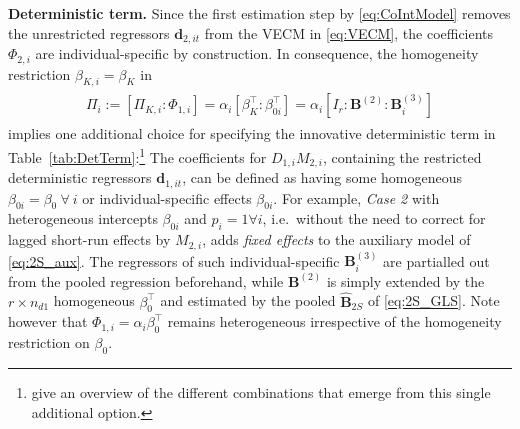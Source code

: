 \textbf{Deterministic term.} Since the first estimation step by \eqref{eq:CoIntModel} removes the unrestricted regressors $ \boldsymbol{d}_{2,it} $ from the VECM in \eqref{eq:VECM}, the coefficients $ \Phi_{2,i} $ are individual-specific by construction. In consequence, the homogeneity restriction $ \beta_{K,i} = \beta_K $ in 
\begin{align} \label{eq:2S_det}
\begin{split}
	\Pi_i := \left[ \Pi_{K,i} : \Phi_{1,i} \right] = \alpha_i \left[ \beta_{K}^\top : \beta_{0i}^\top \right] = \alpha_i \left[I_r^{\ } : \mathbf{B}_{\ }^{(2)} : \mathbf{B}_i^{(3)} \right]
\end{split}
\end{align}
implies one additional choice for specifying the innovative deterministic term in Table~\ref{tab:DetTerm}:\footnote{\citet[Ch.~4.1]{GroenFrank2003} give an overview of the different combinations that emerge from this single additional option.} 
The coefficients for $ D_{1,i} M_{2,i} $, containing the restricted deterministic regressors $ \boldsymbol{d}_{1,it} $, can be defined as having some homogeneous $ \beta_{0i} = \beta_{0} \ \forall \ i $ or individual-specific effects $ \beta_{0i} $. For example, \textit{Case 2} with heterogeneous intercepts $ \beta_{0i} $ and $ p_i = 1 \forall i $, i.e.~without the need to correct for lagged short-run effects by $ M_{2,i} $, adds \textit{fixed effects} to the auxiliary model of \eqref{eq:2S_aux}. The regressors of such individual-specific $ \mathbf{B}_i^{(3)} $ are partialled out from the pooled regression beforehand, while $ \mathbf{B}^{(2)} $ is simply extended by the $ r \times n_{d1} $ homogeneous $ \beta_{0}^\top $ and estimated by the pooled $ \widehat{\mathbf{B}}_{2S} $ of \eqref{eq:2S_GLS}. Note however that $ \Phi_{1,i} = \alpha_{i} \beta_{0}^\top $ remains heterogeneous irrespective of the homogeneity restriction on $ \beta_{0} $.


